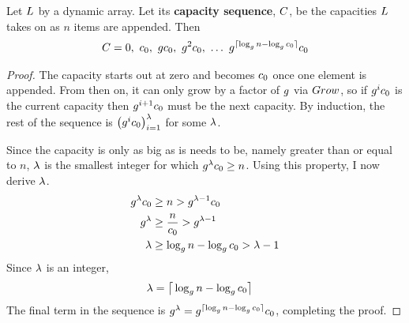 \begin{lemma}
\label{lem:CapacitySeq}
	Let $L$ by a dynamic array. Let its \textbf{capacity sequence}, $C$, be the capacities $L$ takes on as $n$ items are appended. Then
	\begin{align*}
	\VarCapacitySeq = 0,\ \VarInitCapacity,\ \VarGrowthFactor\VarInitCapacity,\ \VarGrowthFactor^2\VarInitCapacity,\ \ldots\ \VarGrowthFactor^{\lceil \log_{\VarGrowthFactor} n - \log_{\VarGrowthFactor} \VarInitCapacity \rceil}\VarInitCapacity
	\end{align*}
\end{lemma}


\begin{proof}
	The capacity starts out at zero and becomes $c_0$ once one element is appended. From then on, it can only grow by a factor of $g$ via $Grow$, so if $g^ic_0$ is the current capacity then $g^{i + 1}c_0$ must be the next capacity. By induction, the rest of the sequence is $\left( g^ic_0 \right)_{i = 1}^\lambda$ for some $\lambda$.
	
	Since the capacity is only as big as is needs to be, namely greater than or equal to $n$, $\lambda$ is the smallest integer for which $g^\lambda c_0 \geq n$. Using this property, I now derive $\lambda$.
	\begin{align*}
	g^\lambda c_0 &\geq n > g^{\lambda - 1}c_0\\
	g^\lambda &\geq \frac{n}{c_0} > g^{\lambda - 1}\\
	\lambda &\geq \log_{g} n - \log_{g} c_0 > \lambda - 1\\
	\end{align*}
	Since $\lambda$ is an integer,
	\begin{align*}
	\lambda &= \big\lceil \log_{g} n - \log_{g} c_0 \big\rceil
	\end{align*}
	The final term in the sequence is $g^\lambda = g^{\lceil \log_{g} n - \log_{g} c_0 \rceil}c_0$, completing the proof.
\end{proof}

